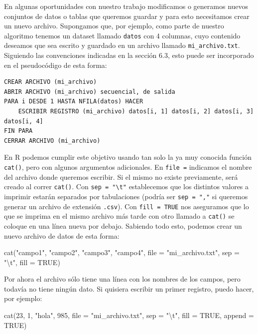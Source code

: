 \documentclass[
]{book}
\newenvironment{Shaded}{\begin{snugshade}}{\end{snugshade}}
\newcommand{\AttributeTok}[1]{\textcolor[rgb]{0.77,0.63,0.00}{#1}}
\newcommand{\ConstantTok}[1]{\textcolor[rgb]{0.00,0.00,0.00}{#1}}
\newcommand{\DecValTok}[1]{\textcolor[rgb]{0.00,0.00,0.81}{#1}}
\newcommand{\FunctionTok}[1]{\textcolor[rgb]{0.00,0.00,0.00}{#1}}
\newcommand{\NormalTok}[1]{#1}
\newcommand{\SpecialCharTok}[1]{\textcolor[rgb]{0.00,0.00,0.00}{#1}}
\newcommand{\StringTok}[1]{\textcolor[rgb]{0.31,0.60,0.02}{#1}}
\begin{document}
En algunas oportunidades con nuestro trabajo modificamos o generamos nuevos conjuntos de datos o tablas que queremos guardar y para esto necesitamos crear un nuevo archivo. Supongamos que, por ejemplo, como parte de nuestro algoritmo tenemos un dataset llamado \texttt{datos} con 4 columnas, cuyo contenido deseamos que sea escrito y guardado en un archivo llamado \texttt{mi\_archivo.txt}. Siguiendo las convenciones indicadas en la sección 6.3, esto puede ser incorporado en el pseudocódigo de esta forma:

\begin{verbatim}
CREAR ARCHIVO (mi_archivo)
ABRIR ARCHIVO (mi_archivo) secuencial, de salida
PARA i DESDE 1 HASTA NFILA(datos) HACER
    ESCRIBIR REGISTRO (mi_archivo) datos[i, 1] datos[i, 2] datos[i, 3] datos[i, 4]
FIN PARA
CERRAR ARCHIVO (mi_archivo)
\end{verbatim}

En R podemos cumplir este objetivo usando tan solo la ya muy conocida función \texttt{cat()}, pero con algunos argumentos adicionales. En \texttt{file\ =} indicamos el nombre del archivo donde queremos escribir. Si el mismo no existe previamente, será creado al correr \texttt{cat()}. Con \texttt{sep\ =\ "\textbackslash{}t"} establecemos que los distintos valores a imprimir estarán separados por tabulaciones (podría ser \texttt{sep\ =\ ","} si queremos generar un archivo de extensión \texttt{.csv}). Con \texttt{fill\ =\ TRUE} nos aseguramos que lo que se imprima en el mismo archivo más tarde con otro llamado a \texttt{cat()} se coloque en una línea nueva por debajo. Sabiendo todo esto, podemos crear un nuevo archivo de datos de esta forma:

\begin{Shaded}
\begin{Highlighting}[]
\FunctionTok{cat}\NormalTok{(}\StringTok{"campo1"}\NormalTok{, }\StringTok{"campo2"}\NormalTok{, }\StringTok{"campo3"}\NormalTok{, }\StringTok{"campo4"}\NormalTok{, }\AttributeTok{file =} \StringTok{"mi\_archivo.txt"}\NormalTok{, }\AttributeTok{sep =} \StringTok{"}\SpecialCharTok{\textbackslash{}t}\StringTok{"}\NormalTok{, }\AttributeTok{fill =} \ConstantTok{TRUE}\NormalTok{)}
\end{Highlighting}
\end{Shaded}

Por ahora el archivo sólo tiene una línea con los nombres de los campos, pero todavía no tiene ningún dato. Si quisiera escribir un primer registro, puedo hacer, por ejemplo:

\begin{Shaded}
\begin{Highlighting}[]
\FunctionTok{cat}\NormalTok{(}\DecValTok{23}\NormalTok{, }\DecValTok{1}\NormalTok{, }\StringTok{"hola"}\NormalTok{, }\DecValTok{985}\NormalTok{, }\AttributeTok{file =} \StringTok{"mi\_archivo.txt"}\NormalTok{, }\AttributeTok{sep =} \StringTok{"}\SpecialCharTok{\textbackslash{}t}\StringTok{"}\NormalTok{, }\AttributeTok{fill =} \ConstantTok{TRUE}\NormalTok{, }\AttributeTok{append =} \ConstantTok{TRUE}\NormalTok{)}
\end{Highlighting}
\end{Shaded}
\end{document}

